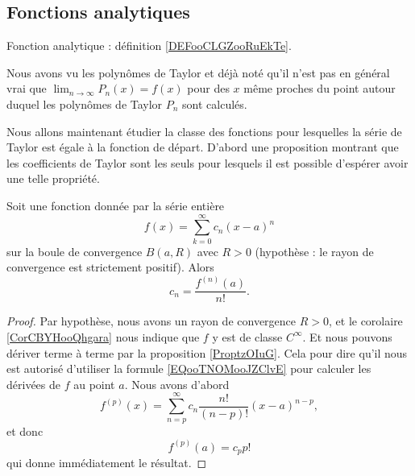\subsection{Fonctions analytiques}
\label{SUBSECooXKHWooEzqGRJ}

Fonction analytique : définition \ref{DEFooCLGZooRuEkTe}.

Nous avons vu les polynômes de Taylor et déjà noté qu'il n'est pas en général vrai que \( \lim_{n\to \infty} P_n(x)=f(x)\) pour des \( x\) même proches du point autour duquel les polynômes de Taylor \( P_n\) sont calculés.

Nous allons maintenant étudier la classe des fonctions pour lesquelles la série de Taylor est égale à la fonction de départ. D'abord une proposition montrant que les coefficients de Taylor sont les seuls pour lesquels il est possible d'espérer avoir une telle propriété.
\begin{proposition}      \label{PROPooTRWVooETTtbP}
	Soit une fonction donnée par la série entière
	\begin{equation}
		f(x)=\sum_{k=0}^{\infty}c_n(x-a)^n
	\end{equation}
	sur la boule de convergence \( B(a,R)\) avec \( R>0\) (hypothèse : le rayon de convergence est strictement positif). Alors
	\begin{equation}
		c_n=\frac{ f^{(n)}(a) }{ n! }.
	\end{equation}
\end{proposition}

\begin{proof}
	Par hypothèse, nous avons un rayon de convergence \( R>0\), et le corolaire \ref{CorCBYHooQhgara} nous indique que \( f\) y est de classe \(  C^{\infty}\). Et nous pouvons dériver terme à terme par la proposition \ref{ProptzOIuG}. Cela pour dire qu'il nous est autorisé d'utiliser la formule \eqref{EQooTNOMooJZClvE} pour calculer les dérivées de \( f\) au point \( a\). Nous avons d'abord
	\begin{equation}
		f^{(p)}(x)=\sum_{n=p}^{\infty}c_n\frac{ n! }{ (n-p)! }(x-a)^{n-p},
	\end{equation}
	et donc
	\begin{equation}
		f^{(p)}(a)=c_pp!
	\end{equation}
	qui donne immédiatement le résultat.
\end{proof}

